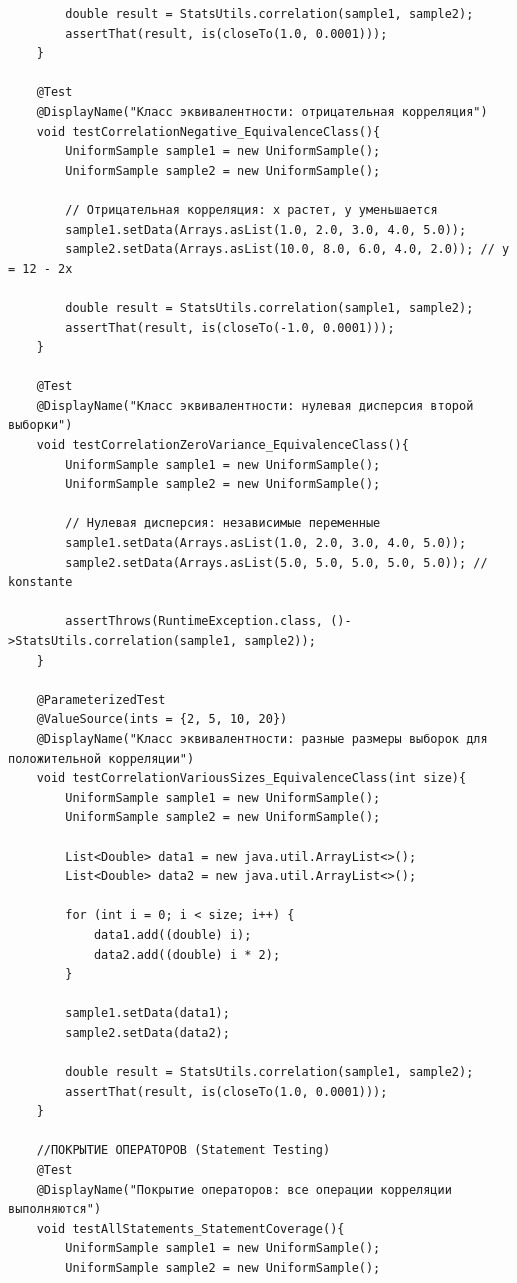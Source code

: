 \begin{verbatim}
        double result = StatsUtils.correlation(sample1, sample2);
        assertThat(result, is(closeTo(1.0, 0.0001)));
    }

    @Test
    @DisplayName("Класс эквивалентности: отрицательная корреляция")
    void testCorrelationNegative_EquivalenceClass(){
        UniformSample sample1 = new UniformSample();
        UniformSample sample2 = new UniformSample();

        // Отрицательная корреляция: x растет, y уменьшается
        sample1.setData(Arrays.asList(1.0, 2.0, 3.0, 4.0, 5.0));
        sample2.setData(Arrays.asList(10.0, 8.0, 6.0, 4.0, 2.0)); // y = 12 - 2x

        double result = StatsUtils.correlation(sample1, sample2);
        assertThat(result, is(closeTo(-1.0, 0.0001)));
    }

    @Test
    @DisplayName("Класс эквивалентности: нулевая дисперсия второй выборки")
    void testCorrelationZeroVariance_EquivalenceClass(){
        UniformSample sample1 = new UniformSample();
        UniformSample sample2 = new UniformSample();

        // Нулевая дисперсия: независимые переменные
        sample1.setData(Arrays.asList(1.0, 2.0, 3.0, 4.0, 5.0));
        sample2.setData(Arrays.asList(5.0, 5.0, 5.0, 5.0, 5.0)); // konstante

        assertThrows(RuntimeException.class, ()->StatsUtils.correlation(sample1, sample2));
    }

    @ParameterizedTest
    @ValueSource(ints = {2, 5, 10, 20})
    @DisplayName("Класс эквивалентности: разные размеры выборок для положительной корреляции")
    void testCorrelationVariousSizes_EquivalenceClass(int size){
        UniformSample sample1 = new UniformSample();
        UniformSample sample2 = new UniformSample();

        List<Double> data1 = new java.util.ArrayList<>();
        List<Double> data2 = new java.util.ArrayList<>();

        for (int i = 0; i < size; i++) {
            data1.add((double) i);
            data2.add((double) i * 2);
        }

        sample1.setData(data1);
        sample2.setData(data2);

        double result = StatsUtils.correlation(sample1, sample2);
        assertThat(result, is(closeTo(1.0, 0.0001)));
    }

    //ПОКРЫТИЕ ОПЕРАТОРОВ (Statement Testing)
    @Test
    @DisplayName("Покрытие операторов: все операции корреляции выполняются")
    void testAllStatements_StatementCoverage(){
        UniformSample sample1 = new UniformSample();
        UniformSample sample2 = new UniformSample();


\end{verbatim}
